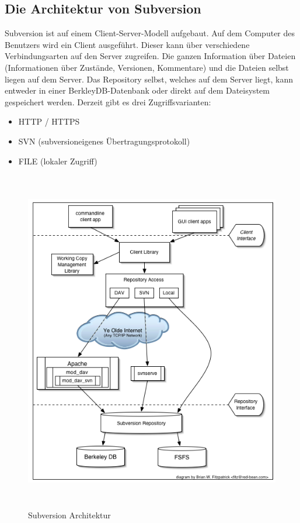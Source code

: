 \subsection{Die Architektur von Subversion}
Subversion ist auf einem Client-Server-Modell aufgebaut. Auf dem Computer des Benutzers wird ein Client ausgef\"uhrt. Dieser kann \"uber verschiedene Verbindungsarten auf den Server zugreifen. Die ganzen Information \"uber Dateien (Informationen \"uber Zust\"ande, Versionen, Kommentare) und die Dateien selbst liegen auf dem Server. Das Repository selbst, welches auf dem Server liegt, kann entweder in einer BerkleyDB-Datenbank oder direkt auf dem Dateisystem gespeichert werden. Derzeit gibt es drei Zugriffsvarianten:
\begin{itemize}
    \item HTTP / HTTPS
    \item SVN (subversioneigenes \"Ubertragungsprotokoll)
    \item FILE (lokaler Zugriff)
\end{itemize}
\newpage
\begin{figure}[!htbp]
\centering
\includegraphics[height=15cm]{subversion_architektur.png}
\caption{Subversion Architektur}
\label{fig:SVarch}
\end{figure}

